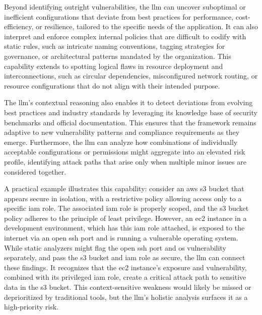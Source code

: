 Beyond identifying outright vulnerabilities, the \gls{llm} can uncover suboptimal or inefficient configurations that deviate from best practices for performance, cost-efficiency, or resilience, tailored to the specific needs of the application\cite{andrade_enhancing_2025-1}. It can also interpret and enforce complex internal policies that are difficult to codify with static rules, such as intricate naming conventions, tagging strategies for governance, or architectural patterns mandated by the organization\cite{li_iris_2025}. This capability extends to spotting logical flaws in resource deployment and interconnections, such as circular dependencies, misconfigured network routing, or resource configurations that do not align with their intended purpose\cite{li_iris_2025, andrade_enhancing_2025-1}.

The \gls{llm}’s contextual reasoning also enables it to detect deviations from evolving best practices and industry standards by leveraging its knowledge base of security benchmarks and official documentation. This ensures that the framework remains adaptive to new vulnerability patterns and compliance requirements as they emerge\cite{li_iris_2025, andrade_enhancing_2025-1}. Furthermore, the \gls{llm} can analyze how combinations of individually acceptable configurations or permissions might aggregate into an elevated risk profile, identifying attack paths that arise only when multiple minor issues are considered together\cite{andrade_enhancing_2025-1}.

A practical example illustrates this capability: consider an \gls{aws} \gls{s3} bucket that appears secure in isolation, with a restrictive policy allowing access only to a specific \gls{iam} role. The associated \gls{iam} role is properly scoped, and the \gls{s3} bucket policy adheres to the principle of least privilege. However, an \gls{ec2} instance in a development environment, which has this \gls{iam} role attached, is exposed to the internet via an open \gls{ssh} port and is running a vulnerable operating system\cite{andrade_enhancing_2025-1}. 
While static analyzers might flag the open \gls{ssh} port and \gls{os} vulnerability separately, and pass the \gls{s3} bucket and \gls{iam} role as secure, the \gls{llm} can connect these findings. It recognizes that the \gls{ec2} instance’s exposure and vulnerability, combined with its privileged \gls{iam} role, create a critical attack path to sensitive data in the \gls{s3} bucket\cite{li_iris_2025}. This context-sensitive weakness would likely be missed or deprioritized by traditional tools, but the \gls{llm}’s holistic analysis surfaces it as a high-priority risk\cite{li_iris_2025, andrade_enhancing_2025-1}.

